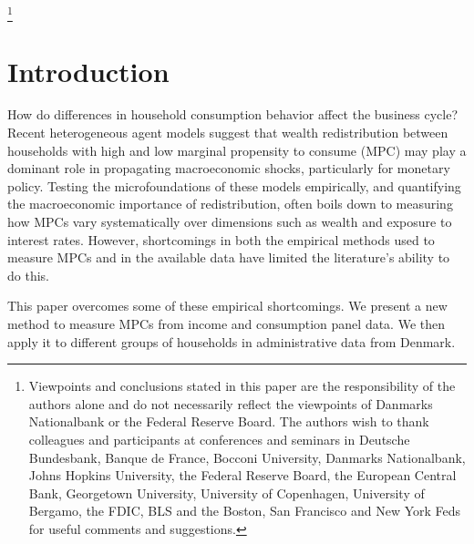 \documentclass[titlepage]{\econtex}\newcommand{\texname}{ConsumptionHeterogeneity}
\begin{document}
\begin{authorsinfo}
\end{authorsinfo}
\thanks{Viewpoints and conclusions stated in this paper are the responsibility of the authors alone and do not necessarily reflect the viewpoints of Danmarks Nationalbank or the Federal Reserve Board. The authors wish to thank colleagues and participants at conferences and seminars in Deutsche Bundesbank, Banque de France, Bocconi University, Danmarks Nationalbank, Johns Hopkins University, the Federal Reserve Board, the European Central Bank, Georgetown University, University of Copenhagen, University of Bergamo, the FDIC, BLS and the Boston, San Francisco and New York Feds for useful comments and suggestions.}

\titlepagefinish
\setcounter{page}{1}

\pagebreak
\section{Introduction}
How do differences in household consumption behavior affect the business cycle? Recent heterogeneous agent models suggest that wealth redistribution between households with high and low marginal propensity to consume (MPC) may play a dominant role in propagating macroeconomic shocks, particularly for monetary policy. Testing the microfoundations of these models empirically, and quantifying the macroeconomic importance of redistribution, often boils down to measuring how MPCs vary systematically over dimensions such as wealth and exposure to interest rates. However, shortcomings in both the empirical methods used to measure MPCs and in the available data have limited the literature's ability to do this.

This paper overcomes some of these empirical shortcomings. We present a new method to measure MPCs from income and consumption panel data. We then apply it to different groups of households in administrative data from Denmark.
\end{document}
